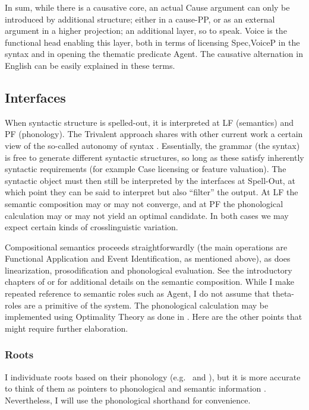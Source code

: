\begin{exe}
\begin{xlist}
\begin{exe}
\begin{exe}
\begin{exe}
\begin{exe}
\begin{xlist}
\begin{exe}
\begin{xlist}
\begin{xlist}
\begin{xlist}
\begin{exe}
\begin{xlist}
\begin{exe}
\begin{exe}
\begin{exe}
\begin{exe}
\begin{xlist}
\begin{exe}
\begin{xlist}
\begin{exe}
\begin{exe}
\begin{xlist}
In sum, while there is a causative core, an actual Cause argument can only be introduced by additional structure; either in a cause-PP, or as an external argument in a higher projection; an additional layer, so to speak. Voice is the functional head enabling this layer, both in terms of licensing Spec,VoiceP in the syntax and in opening the thematic predicate Agent. The causative alternation in English can be easily explained in these terms.

	\subsection{Interfaces} \label{intro:arch:inter}
When syntactic structure is spelled-out, it is interpreted at LF (semantics) and PF (phonology). The Trivalent approach shares with other current work a certain view of the so-called autonomy of syntax \citep{marantz13,wood15springer,woodmarantz17,myler17oup}. Essentially, the grammar (the syntax) is free to generate different syntactic structures, so long as these satisfy inherently syntactic requirements (for example Case licensing or feature valuation). The syntactic object must then still be interpreted by the interfaces at Spell-Out, at which point they can be said to interpret but also ``filter'' the output. At LF the semantic composition may or may not converge, and at PF the phonological calculation may or may not yield an optimal candidate. In both cases we may expect certain kinds of crosslinguistic variation.

\label{r1:2:3a}Compositional semantics proceeds straightforwardly (the main operations are Functional Application and Event Identification, as mentioned above), as does linearization, prosodification and phonological evaluation. See the introductory chapters of \cite{wood15springer} or \cite{myler16mit} for additional details on the semantic composition. While I make repeated reference to semantic roles such as Agent, I do not assume that theta-roles are a primitive of the system. The phonological calculation may be implemented using Optimality Theory \citep{ot} as done in \cite{kastner18nllt}. Here are the other points that might require further elaboration.

		\subsubsection{Roots}
I individuate roots based on their phonology (e.g.~ and ), but it is more accurate to think of them as pointers to phonological and semantic information \citep{harley14thlia,faust16,kastner18nllt}. Nevertheless, I will use the phonological shorthand for convenience.


\end{xlist}
\end{exe}
\end{exe}
\end{xlist}
\end{exe}
\end{xlist}
\end{exe}
\end{exe}
\end{exe}
\end{exe}
\end{xlist}
\end{exe}
\end{xlist}
\end{xlist}
\end{xlist}
\end{exe}
\end{xlist}
\end{exe}
\end{exe}
\end{exe}
\end{exe}
\end{xlist}
\end{exe}
